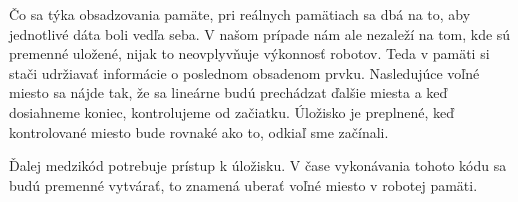 Čo sa týka obsadzovania pamäte, pri reálnych pamätiach sa dbá na to, aby jednotlivé dáta boli vedľa seba. 
V našom prípade nám ale nezaleží na tom, kde sú premenné uložené, nijak to neovplyvňuje výkonnosť robotov. Teda v pamäti si stači udržiavať informácie o poslednom obsadenom prvku. Nasledujúce voľné miesto sa nájde tak, že sa lineárne budú prechádzat ďalšie miesta a keď dosiahneme koniec, kontrolujeme od začiatku. Úložisko je preplnené, keď kontrolované miesto bude rovnaké ako to, odkiaľ sme začínali.

Ďalej medzikód potrebuje prístup k úložisku. V čase vykonávania tohoto kódu sa budú premenné vytvárať, to znamená uberať voľné miesto v robotej pamäti. \\

